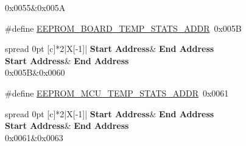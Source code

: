 \begin{DoxyCompactItemize}
\begin{DoxyCompactList}
\begin{longtabu}
\endhead
0x0055&0x005A \\
\end{longtabu}
\end{DoxyCompactList}\item 
\mbox{\label{group__defines__eeprom__address__map_ga400ff3c988dbb629cd17e1e7befee3bc}} 
\#define \hyperlink{group__defines__eeprom__address__map_ga400ff3c988dbb629cd17e1e7befee3bc}{E\+E\+P\+R\+O\+M\+\_\+\+B\+O\+A\+R\+D\+\_\+\+T\+E\+M\+P\+\_\+\+S\+T\+A\+T\+S\+\_\+\+A\+D\+DR}~0x005B
\begin{DoxyCompactList}\small\item\em \tabulinesep=1mm
\begin{longtabu} spread 0pt [c]{*{2}{|X[-1]}|}
\hline
\rowcolor{\tableheadbgcolor}\textbf{ Start Address}&\textbf{ End Address  }\\
\endfirsthead
\hline
\endfoot
\hline
\rowcolor{\tableheadbgcolor}\textbf{ Start Address}&\textbf{ End Address  }\\
\endhead
0x005B&0x0060 \\
\end{longtabu}
\end{DoxyCompactList}\item 
\mbox{\label{group__defines__eeprom__address__map_gaf3993737bc8bdb1ee7aac5a636fc6936}} 
\#define \hyperlink{group__defines__eeprom__address__map_gaf3993737bc8bdb1ee7aac5a636fc6936}{E\+E\+P\+R\+O\+M\+\_\+\+M\+C\+U\+\_\+\+T\+E\+M\+P\+\_\+\+S\+T\+A\+T\+S\+\_\+\+A\+D\+DR}~0x0061
\begin{DoxyCompactList}\small\item\em \tabulinesep=1mm
\begin{longtabu} spread 0pt [c]{*{2}{|X[-1]}|}
\hline
\rowcolor{\tableheadbgcolor}\textbf{ Start Address}&\textbf{ End Address  }\\
\endfirsthead
\hline
\endfoot
\hline
\rowcolor{\tableheadbgcolor}\textbf{ Start Address}&\textbf{ End Address  }\\
\endhead
0x0061&0x0063 \\
\end{longtabu}
\end{DoxyCompactList}\end{DoxyCompactItemize}


